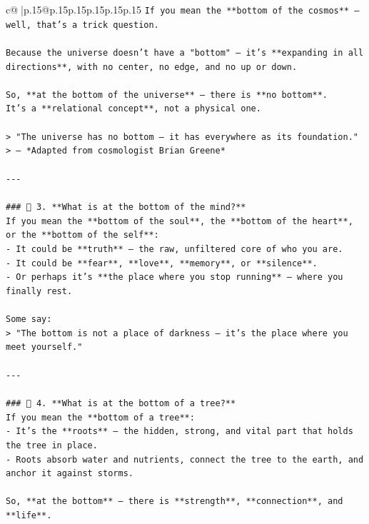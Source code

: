 \documentclass{article}
\begin{document}
{\begin{supertabular}{c@{$\;$}|p{.15\linewidth}@{}p{.15\linewidth}p{.15\linewidth}p{.15\linewidth}p{.15\linewidth}p{.15\linewidth}}
{{{\texttt{If you mean the **bottom of the cosmos** — well, that’s a trick question.} \\
\\ 
\texttt{Because the universe doesn’t have a "bottom" — it’s **expanding in all directions**, with no center, no edge, and no up or down.} \\
\\ 
\texttt{So, **at the bottom of the universe** — there is **no bottom**.  } \\
\texttt{It’s a **relational concept**, not a physical one.} \\
\\ 
\texttt{> "The universe has no bottom — it has everywhere as its foundation."  } \\
\texttt{> — *Adapted from cosmologist Brian Greene*} \\
\\ 
\texttt{{-}{-}{-}} \\
\\ 
\texttt{\#\#\# 🧠 3. **What is at the bottom of the mind?**} \\
\texttt{If you mean the **bottom of the soul**, the **bottom of the heart**, or the **bottom of the self**:} \\
\texttt{{-} It could be **truth** — the raw, unfiltered core of who you are.} \\
\texttt{{-} It could be **fear**, **love**, **memory**, or **silence**.} \\
\texttt{{-} Or perhaps it’s **the place where you stop running** — where you finally rest.} \\
\\ 
\texttt{Some say:} \\
\texttt{> "The bottom is not a place of darkness — it’s the place where you meet yourself."} \\
\\ 
\texttt{{-}{-}{-}} \\
\\ 
\texttt{\#\#\# 🌱 4. **What is at the bottom of a tree?**} \\
\texttt{If you mean the **bottom of a tree**:} \\
\texttt{{-} It’s the **roots** — the hidden, strong, and vital part that holds the tree in place.} \\
\texttt{{-} Roots absorb water and nutrients, connect the tree to the earth, and anchor it against storms.} \\
\\ 
\texttt{So, **at the bottom** — there is **strength**, **connection**, and **life**.} \\
}}}
\end{supertabular}}
\end{document}
